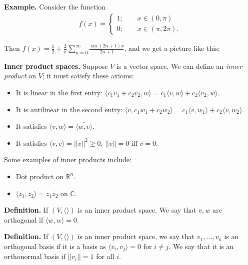\documentclass{article}
\newcommand{\RR}{\mathbb{R}}
\newcommand{\ol}{\overline}
\begin{document}
{\bf Example.} Consider the function
\begin{align*}
  f(x) = 
  \begin{cases}
    1; \qquad x \in (0, \pi) \\
    0; \qquad x \in (\pi, 2 \pi).
  \end{cases}
\end{align*}

Then $f(x) = \frac{1}{2} + \frac{2}{\pi} \sum_{n=0}^{\infty} \frac{\sin (2n+1)x}{2n+1}$, and we get a picture like this:


{\bf Inner product spaces.} Suppose $V$ is a vector space.  We can define an {\it inner product} on $V$; it must satisfy these axioms:

\begin{itemize}
  \item It is linear in the first entry: $\langle c_1 v_1 + c_2 v_2, w\rangle = c_1 \langle v, w\rangle + c_2 \langle v_2, w\rangle$.
  \item It is antilinear in the second entry: $\langle v, c_1 w_1 + c_2 w_2\rangle = \ol{c_1} \langle v, w_1\rangle + \ol{c_2} \langle v, w_2\rangle$.
  \item It satisfies $\langle v, w\rangle = \ol{\langle w, v\rangle}$.
  \item It satisfies $\langle v, v\rangle = ||v||^2 \geq 0$, $||v|| = 0$ iff $v = 0$.
\end{itemize}

Some examples of inner products include:
\begin{itemize}
  \item Dot product on $\RR^n$.
  \item $\langle z_1, z_2\rangle = z_1 \ol{z_2}$ on $\mathbb{C}$. 
\end{itemize}

{\bf Definition.} If $(V, \langle \rangle)$ is an inner product space.  We say that $v, w$ are orthogonal if $\langle w, w\rangle = 0$.

{\bf Definition.} If $(V, \langle \rangle)$ is an inner product space, we say that $v_1, \dots, v_n$ is an orthogonal basis if it is a basis as $\langle v_i, v_j\rangle = 0$ for $i \neq j$.  We say that it is an orthonormal basis if $||v_i|| = 1$ for all $i$.
\end{document}
